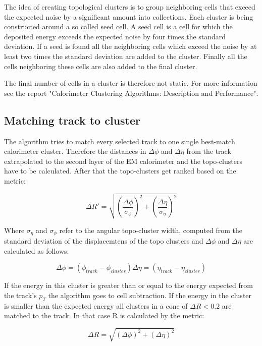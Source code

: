 The idea of creating topological clusters is to group neighboring cells that exceed the expected noise by a significant amount into collections. 
Each cluster is being constructed around a so called seed cell. A seed cell is a cell for which the deposited energy exceeds the expected noise by four times the standard deviation. If a seed is found all the neighboring cells which exceed the noise by at least two times the standard deviation are added to the cluster. Finally all the cells neighboring these cells are also added to the final cluster.

The final number of cells in a cluster is therefore not static. For more information see the report "Calorimeter Clustering Algorithms: Description and Performance"\cite{cluster08}.


\subsection{Matching track to cluster}

The algorithm tries to match every selected track to one single best-match calorimeter cluster. 
Therefore the distances in $\Delta \phi$ and $\Delta \eta$ from the track extrapolated to the second layer of the EM calorimeter and the topo-clusters have to be calculated. After that the topo-clusters get ranked based on the metric:

\begin{equation}
\Delta R' = \sqrt{\left(\frac{\Delta \phi}{\sigma_{\phi}}\right)^2+\left(\frac{\Delta \eta}{\sigma_{\eta}}\right)^2}
\end{equation}

Where $\sigma_{\eta}$ and $\sigma_{\phi}$ refer to the angular topo-cluster width, computed from the standard deviation of the displacemtens of the topo clusters and $\Delta \phi$ and $\Delta \eta$ are calculated as follows:

\begin{equation}
\Delta \phi = (\phi_{track} - \phi_{cluster})
\Delta \eta = (\eta_{track} - \eta_{cluster})
\end{equation}

If the energy in this cluster is greater than or equal to the energy expected from the track's $p_T$ the algorithm goes to cell subtraction. If the energy in the cluster is smaller than the expected energy all clusters in a cone of $\Delta R < 0.2$ are matched to the track. In that case R is calculated by the metric:

\begin{equation}
\Delta R = \sqrt{(\Delta \phi)^2 + (\Delta \eta)^2}
\end{equation}

